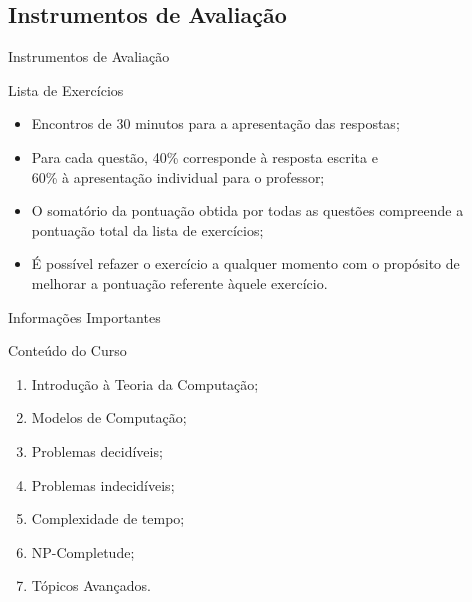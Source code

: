 \documentclass[xcolor=dvipsnames,table]{beamer}
\begin{document}
	\subsection{Instrumentos de Avaliação}
	\begin{frame}{Instrumentos de Avaliação}
		\begin{block}{Lista de Exercícios}
			\begin{itemize}
				\item Encontros de 30 minutos para a apresentação das respostas;
				\item Para cada questão, 40\% corresponde à resposta escrita e \\60\% à apresentação individual para o professor;
				\item O somatório da pontuação obtida por todas as questões compreende a pontuação total da lista de exercícios;
				\item É possível refazer o exercício a qualquer momento com o propósito de melhorar a pontuação referente àquele exercício.
			\end{itemize}
		\end{block}
	\end{frame}
	
	\begin{frame}{Informações Importantes}
		\begin{block}{Conteúdo do Curso}
			\begin{enumerate}
				\item Introdução à Teoria da Computação;
				\item Modelos de Computação;
				\item Problemas decidíveis;
				\item Problemas indecidíveis;
				\item Complexidade de tempo;
				\item NP-Completude;
				\item Tópicos Avançados.
			\end{enumerate}
		\end{block}
	\end{frame}
	
	\begin{frame}
		\titlepage
	\end{frame}
	
\end{document}

